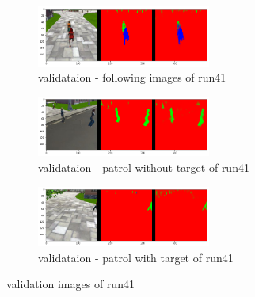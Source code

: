 \documentclass[paper=a4, fontsize=11pt]{scrartcl} %
\numberwithin{equation}{section} %
\numberwithin{figure}{section} %
\numberwithin{table}{section} %
\begin{document}
\begin{figure}[ht]
	\begin{subfigure}{0.33\textwidth}
	\includegraphics[width=0.9\linewidth, height=2cm]{./imgs/following_images4_1.png} 
	\caption{validataion - following images of run41}
	\label{fig:subfollowing_images41}
	\end{subfigure}
	\begin{subfigure}{0.33\textwidth}
	\includegraphics[width=0.9\linewidth, height=2cm]{./imgs/patrol_non_targ4_1.png}
	\caption{validataion - patrol without target of run41}
	\label{fig:subpatrol_non_targ41}
	\end{subfigure}
	\begin{subfigure}{0.33\textwidth}
	\includegraphics[width=0.9\linewidth, height=2cm]{./imgs/patrol_with_targ4_1.png}
	\caption{validataion - patrol with target of run41}
	\label{fig:subpatrol_with_targ41}
	\end{subfigure}

	\caption{validation images of run41}
	\label{fig:outputimages41}
\end{figure}
\end{document}
